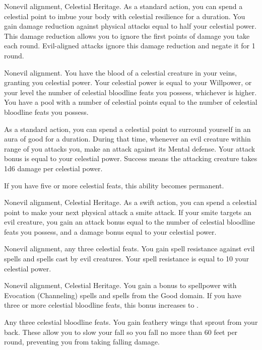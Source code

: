 \featpres
Nonevil alignment, Celestial Heritage.
\featben As a standard action, you can spend a celestial point to imbue your body with celestial resilience for a \durshort duration.
You gain damage reduction against physical attacks equal to half your celestial power.
This damage reduction allows you to ignore the first points of damage you take each round.
Evil-aligned attacks ignore this damage reduction and negate it for 1 round.

\featpre Nonevil alignment.
\featben You have the blood of a celestial creature in your veins, granting you celestial power.
Your celestial power is equal to your Willpower, or your level \add the number of celestial bloodline feats you possess, whichever is higher.
You have a pool with a number of celestial points equal to the number of celestial bloodline feats you possess.

As a standard action, you can spend a celestial point to surround yourself in an aura of good for a \durshort duration.
During that time, whenever an evil creature within \rngclose range of you attacks you, make an attack against its Mental defense.
Your attack bonus is equal to your celestial power.
Success means the attacking creature takes 1d6 damage per celestial power.

If you have five or more celestial feats, this ability becomes permanent.

\featpres Nonevil alignment, Celestial Heritage.
\featben As a swift action, you can spend a celestial point to make your next physical attack a smite attack.
If your smite targets an evil creature, you gain an attack bonus equal to the number of celestial bloodline feats you possess, and a damage bonus equal to your celestial power.

\featpres Nonevil alignment, any three celestial feats.
\featben You gain spell resistance against evil spells and spells cast by evil creatures.
Your spell resistance is equal to 10 \add your celestial power.

\featpres Nonevil alignment, Celestial Heritage.
\featben You gain a  bonus to spellpower with Evocation (Channeling) spells and spells from the Good domain.
If you have three or more celestial bloodline feats, this bonus increases to .

\featpre Any three celestial bloodline feats.
\featben You gain feathery wings that sprout from your back.
These allow you to slow your fall so you fall no more than 60 feet per round, preventing you from taking falling damage.

